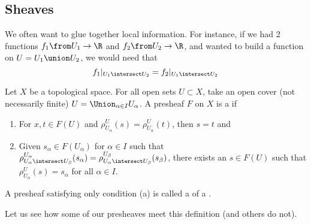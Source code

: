 \documentclass[11pt,leqno,oneside]{amsbook}
\renewcommand{\F}{F} %
\numberwithin{thm}{section}
\begin{document}
\subsection{Sheaves}
We often want to glue together local information. For instance, if we
had 2 functions \(f_1 \from U_1 \to \R\) and \(f_2 \from U_2 \to \R\),
and wanted to build a function on \(U = U_1 \union U_2\), we would
need that \[
  f_1|_{U_1 \intersect U_2} = f_2|_{U_1 \intersect U_2}
\]
\begin{defn}
  Let \(X\) be a topological space. For all open sets \(U \subset X\),
  take an open cover (not necessarily finite)  \(U = \Union_{\alpha
    \in I} U_\alpha\). A presheaf \(\F\) on \(X\) is a  if
  \begin{enumerate}[label=(S\arabic*)]
  \item\label{sheaf-1} For \(x,t \in \F(U)\) and \(\rho^U_{U_\alpha}(s) =
    \rho^U_{U_\alpha}(t)\), then \(s=t\) and
  \item\label{sheaf-2} Given \(s_\alpha \in \F(U_\alpha)\) for \(\alpha \in I\) such that
    \(\rho^{U_\alpha}_{U_\alpha \intersect U_\beta}(s_\alpha) =
    \rho^{U_\beta}_{U_\alpha \intersect U_\beta}(s_\beta) \), there
    exists an \(s \in \F(U)\) such that \(\rho^U_{U_\alpha}(s) =
    s_\alpha \) for all \(\alpha \in I\).
  \end{enumerate}
\end{defn}
\begin{rmk}
  A presheaf satisfying only condition (a) is called a  of a .
\end{rmk}
Let us see how some of our presheaves meet this definition (and others
do not).
\end{document}
